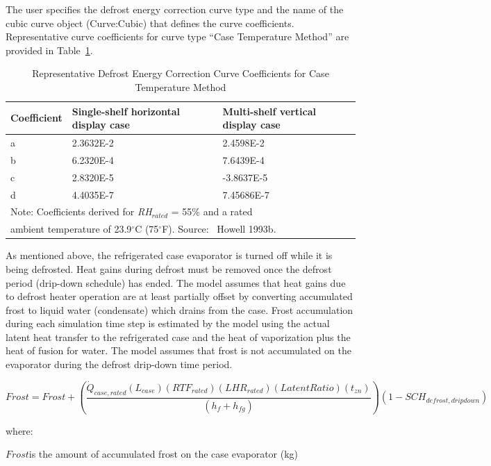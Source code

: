 The user specifies the defrost energy correction curve type and the name of the cubic curve object (Curve:Cubic) that defines the curve coefficients. Representative curve coefficients for curve type ``Case Temperature Method'' are provided in Table~\ref{table:representative-defrost-energy-correction}.

\begin{longtable}[c]{p{1.5in}p{2.36in}p{2.13in}}
\caption{Representative Defrost Energy Correction Curve Coefficients for Case Temperature Method \label{table:representative-defrost-energy-correction}} \tabularnewline
\toprule 
Coefficient & Single-shelf horizontal display case & Multi-shelf vertical display case \tabularnewline
\midrule
\endhead

a & 2.3632E-2 & 2.4598E-2 \tabularnewline
b & 6.2320E-4 & 7.6439E-4 \tabularnewline
c & 2.8320E-5 & -3.8637E-5 \tabularnewline
d & 4.4035E-7 & 7.45686E-7 \tabularnewline
\midrule
\multicolumn{3}{l}{Note: Coefficients derived for \emph{RH\(_{rated}\)} = 55\% and a rated} \tabularnewline
\multicolumn{3}{l}{ambient temperature of 23.9\(^{\circ}\)C (75\(^{\circ}\)F). Source:~ Howell 1993b.} \tabularnewline
\bottomrule
\end{longtable}

As mentioned above, the refrigerated case evaporator is turned off while it is being defrosted. Heat gains during defrost must be removed once the defrost period (drip-down schedule) has ended. The model assumes that heat gains due to defrost heater operation are at least partially offset by converting accumulated frost to liquid water (condensate) which drains from the case. Frost accumulation during each simulation time step is estimated by the model using the actual latent heat transfer to the refrigerated case and the heat of vaporization plus the heat of fusion for water. The model assumes that frost is not accumulated on the evaporator during the defrost drip-down time period.

\begin{equation}
Frost = Frost + \left( {\frac{{{{\dot Q}_{case,rated}}\left( {{L_{case}}} \right)\left( {RT{F_{rated}}} \right)\left( {LH{R_{rated}}} \right)\left( {LatentRatio} \right)\left( {{t_{zn}}} \right)}}{{\left( {{h_f} + {h_{fg}}} \right)}}} \right)\left( {1 - SC{H_{defrost,dripdown}}} \right)
\end{equation}

where:

\(Frost\)is the amount of accumulated frost on the case evaporator (kg)

